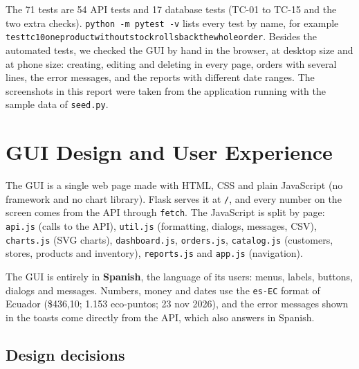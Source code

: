 \documentclass[11pt]{article}
\renewcommand{\_}{\oldus\allowbreak}
\begin{document}
The 71 tests are 54 API tests and 17 database tests (TC-01 to TC-15 and the two extra checks).
\texttt{python -m pytest -v} lists every test by name, for example
\texttt{test\_tc10\_one\_product\_without\_stock\_rolls\_back\_the\_whole\_order}.
Besides the automated tests, we checked the GUI by hand in the browser, at desktop size and at
phone size: creating, editing and deleting in every page, orders with several lines, the error
messages, and the reports with different date ranges. The screenshots in this report were taken
from the application running with the sample data of \texttt{seed.py}.

\section{GUI Design and User Experience}

The GUI is a single web page made with HTML, CSS and plain JavaScript (no framework and no chart
library). Flask serves it at \texttt{/}, and every number on the screen comes from the API through
\texttt{fetch}. The JavaScript is split by page: \texttt{api.js} (calls to the API),
\texttt{util.js} (formatting, dialogs, messages, CSV), \texttt{charts.js} (SVG charts),
\texttt{dashboard.js}, \texttt{orders.js}, \texttt{catalog.js} (customers, stores, products and
inventory), \texttt{reports.js} and \texttt{app.js} (navigation).

The GUI is entirely in \textbf{Spanish}, the language of its users: menus, labels, buttons, dialogs
and messages. Numbers, money and dates use the \texttt{es-EC} format of Ecuador
(\$436,10; 1.153 eco-puntos; 23 nov 2026), and the error messages shown in the toasts come
directly from the API, which also answers in Spanish.

\subsection{Design decisions}
\end{document}
